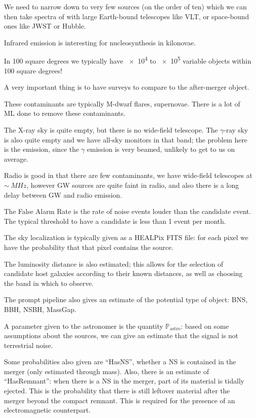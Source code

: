 \documentclass[main.tex]{subfiles}
\begin{document}
We need to narrow down to very few sources (on the order of ten) 
which we can then take spectra of with large Earth-bound telescopes like VLT, or space-bound ones like JWST or Hubble. 

Infrared emission is interesting for nucleosynthesis in kilonovae. 

In 100 square degrees we typically have \num{e4} to \num{e5} variable objects within 100 square degrees! 

A very important thing is to have surveys to compare to the after-merger object. 

These contaminants are typically M-dwarf flares, supernovae. 
There is a lot of ML done to remove these contaminants. 

The X-ray sky is quite empty, but there is no wide-field telescope. 
The \(\gamma \)-ray sky is also quite empty and we have all-sky monitors in that band; the problem here is the emission, since the \(\gamma \) emission is very beamed, unlikely to get to us on average. 

Radio is good in that there are few contaminants, we have wide-field telescopes at \(\sim \SI{}{MHz}\), however GW sources are quite faint in radio, and also there is a long delay between GW and radio emission. 

The False Alarm Rate is the rate of noise events louder than the candidate event. 
The typical threshold to have a candidate is less than 1 event per month. 

The sky localization is typically given as a HEALPix FITS file: for each pixel we have the probability that that pixel contains the source. 

The luminosity distance is also estimated; this allows for the selection of candidate host galaxies according to their known distances, as well as choosing the band in which to observe.

The prompt pipeline also gives an estimate of the potential type of object: BNS, BBH, NSBH, MassGap. 

A parameter given to the astronomer is the quantity \(\mathbb{P} _{\text{astro}}\): based on some assumptions about the sources, we can give an estimate that the signal is not terrestrial noise. 

Some probabilities also given are ``HasNS'', whether a NS is contained in the merger (only estimated through mass). 
Also, there is an estimate of ``HasRemnant'': when there is a NS in the merger, part of its material is tidally ejected.
This is the probability that there is still leftover material after the merger beyond the compact remnant.
This is required for the presence of an electromagnetic counterpart. 
\end{document}
